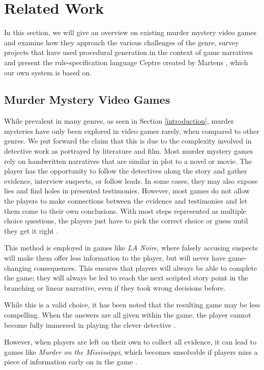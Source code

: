 \section{Related Work} \label{related_work}

In this section, we will give an overview on existing murder mystery video games and examine how they approach the various challenges of the genre, survey projects that have used procedural generation in the context of game narratives and present the rule-specification language Ceptre created by Martens \cite{martens_2015}, which our own system is based on.

\subsection{Murder Mystery Video Games}

While prevalent in many genres, as seen in Section \ref{introduction}, murder mysteries have only been explored in video games rarely, when compared to other genres.
We put forward the claim that this is due to the complexity involved in detective work as portrayed by literature and film.
Most murder mystery games rely on handwritten narratives that are similar in plot to a novel or movie.
The player has the opportunity to follow the detectives along the story and gather evidence, interview suspects, or follow leads.
In some cases, they may also expose lies and find holes in presented testimonies.
However, most games do not allow the players to make connections between the evidence and testimonies and let them come to their own conclusions. With most steps represented as multiple choice questions, the players just have to pick the correct choice or guess until they get it right \cite{brown_2017}.

This method is employed in games like \emph{LA Noire}, where falsely accusing suspects will make them offer less information to the player, but will never have game-changing consequences.
This ensures that players will always be able to complete the game; they will always be led to reach the next scripted story point in the branching or linear narrative, even if they took wrong decisions before.

While this is a valid choice, it has been noted that the resulting game may be less compelling.
When the answers are all given within the game, the player cannot become fully immersed in playing the clever detective \cite{goldstein_2018}.

However, when players are left on their own to collect all evidence, it can lead to games like \emph{Murder on the Mississippi}, which becomes unsolvable if players miss a piece of information early on in the game \cite{petit_2018}.

